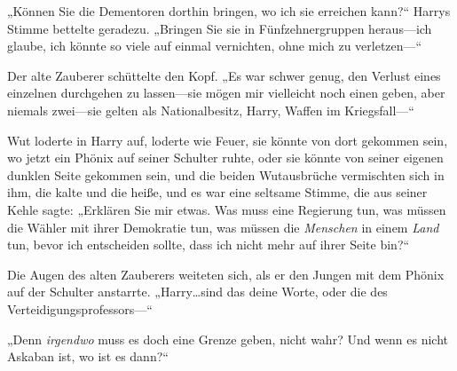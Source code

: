 „Können Sie die Dementoren dorthin bringen, wo ich sie erreichen kann?“ Harrys Stimme bettelte geradezu. „Bringen Sie sie in Fünfzehnergruppen heraus—ich glaube, ich könnte so viele auf einmal vernichten, ohne mich zu verletzen—“

Der alte Zauberer schüttelte den Kopf. „Es war schwer genug, den Verlust eines einzelnen durchgehen zu lassen—sie mögen mir vielleicht noch einen geben, aber niemals zwei—sie gelten als Nationalbesitz, Harry, Waffen im Kriegsfall—“

Wut loderte in Harry auf, loderte wie Feuer, sie könnte von dort gekommen sein, wo jetzt ein Phönix auf seiner Schulter ruhte, oder sie könnte von seiner eigenen dunklen Seite gekommen sein, und die beiden Wutausbrüche vermischten sich in ihm, die kalte und die heiße, und es war eine seltsame Stimme, die aus seiner Kehle sagte: „Erklären Sie mir etwas. Was muss eine Regierung tun, was müssen die Wähler mit ihrer Demokratie tun, was müssen die \emph{Menschen} in einem \emph{Land} tun, bevor ich entscheiden sollte, dass ich nicht mehr auf ihrer Seite bin?“

Die Augen des alten Zauberers weiteten sich, als er den Jungen mit dem Phönix auf der Schulter anstarrte. „Harry…sind das deine Worte, oder die des Verteidigungsprofessors—“

„Denn \emph{irgendwo} muss es doch eine Grenze geben, nicht wahr? Und wenn es nicht Askaban ist, wo ist es dann?“

